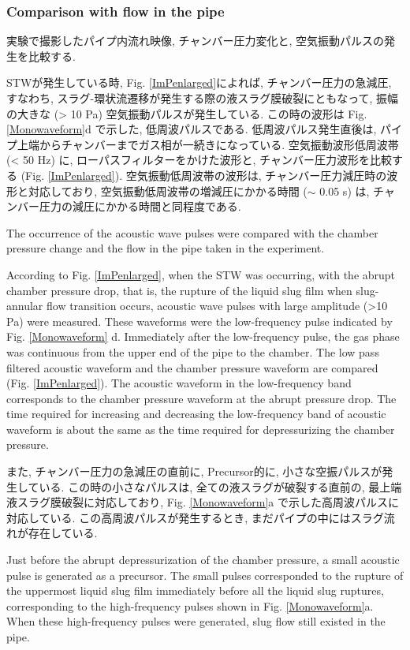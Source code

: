 \documentclass[12pt]{article}
\begin{document}
\clearpage
\subsubsection{Comparison with flow in the pipe}
実験で撮影したパイプ内流れ映像, チャンバー圧力変化と, 空気振動パルスの発生を比較する.

STWが発生している時, Fig. \ref{ImPenlarged}によれば, チャンバー圧力の急減圧, すなわち, スラグ-環状流遷移が発生する際の液スラグ膜破裂にともなって, 振幅の大きな (> 10 Pa) 空気振動パルスが発生している. 
この時の波形は Fig. \ref{Monowaveform}d で示した, 低周波パルスである. 
低周波パルス発生直後は, パイプ上端からチャンバーまでガス相が一続きになっている.
空気振動波形低周波帯 (< 50 Hz) に, ローパスフィルターをかけた波形と, チャンバー圧力波形を比較する (Fig. \ref{ImPenlarged}). 
空気振動低周波帯の波形は, チャンバー圧力減圧時の波形と対応しており, 空気振動低周波帯の増減圧にかかる時間 ($\sim$ 0.05 s) は, チャンバー圧力の減圧にかかる時間と同程度である.

The occurrence of the acoustic wave pulses were compared with the chamber pressure change and the flow in the pipe taken in the experiment.

According to Fig. \ref {ImPenlarged}, when the STW was occurring, with the abrupt chamber pressure drop, that is, the rupture of the liquid slug film when slug-annular flow transition occurs, acoustic wave pulses with large amplitude (>10 Pa) were measured.
These waveforms were the low-frequency pulse indicated by Fig. \ref {Monowaveform} d.
Immediately after the low-frequency pulse, the gas phase was continuous from the upper end of the pipe to the chamber.
The low pass filtered acoustic waveform and the chamber pressure waveform are compared (Fig. \ref{ImPenlarged}).
The acoustic waveform in the low-frequency band corresponds to the chamber pressure waveform at the abrupt pressure drop.
The time required for increasing and decreasing the low-frequency band of acoustic waveform is about the same as the time required for depressurizing the chamber pressure.


また, チャンバー圧力の急減圧の直前に, Precursor的に, 小さな空振パルスが発生している. 
この時の小さなパルスは, 全ての液スラグが破裂する直前の, 最上端液スラグ膜破裂に対応しており, Fig. \ref{Monowaveform}a で示した高周波パルスに対応している. この高周波パルスが発生するとき, まだパイプの中にはスラグ流れが存在している. 

Just before the abrupt depressurization of the chamber pressure, a small acoustic pulse is generated as a precursor.
The small pulses corresponded to the rupture of the uppermost liquid slug film immediately before all the liquid slug ruptures, corresponding to the high-frequency pulses shown in Fig. \ref{Monowaveform}a.
When these high-frequency pulses were generated, slug flow still existed in the pipe.
\end{document}
